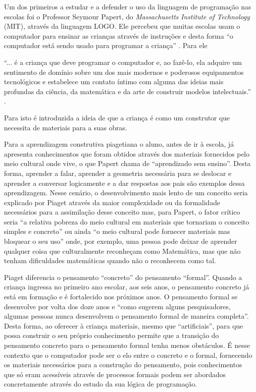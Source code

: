 \documentclass[12pt, openright, a4paper, brazil, english, french, spanish, bibjustif, openany, oneside]{abntex2}
\begin{document}
Um dos primeiros a estudar e a defender o uso da linguagem de programação nas escolas foi o Professor Seymour Papert, do \textit{Massachusetts Institute of Technology} (MIT), através da linguagem LOGO. Ele percebeu que muitas escolas usam o computador para ensinar as crianças através de instruções e desta forma ``o computador está sendo usado para programar a criança'' \cite{papert}. Para ele

\begin{citacao}

``... é a criança que deve programar o computador e, ao fazê-lo, ela adquire um sentimento de domínio sobre um dos mais modernos e poderosos equipamentos tecnológicos e estabelece um contato íntimo com alguma das ideias mais profundas da ciência, da matemática e da arte de construir modelos intelectuais.'' \cite{papert}.

\end{citacao}

Para isto é introduzida a ideia de que a criança é como um construtor que necessita de materiais para a suas obras. 

Para  a aprendizagem construtiva piagetiana o aluno, antes de ir à escola, já apresenta conhecimentos que foram obtidos através dos materiais fornecidos pelo meio cultural onde vive, o que Papert chama de ``aprendizado sem ensino''. Desta forma, aprender a falar, aprender a geometria necessária para se deslocar e aprender a conversar logicamente e a dar respostas aos pais são exemplos dessa aprendizagem. Nesse cenário, o desenvolvimento mais lento de um conceito seria explicado por Piaget através da maior complexidade ou da formalidade necessários para a assimilação desse conceito mas, para Papert, o fator crítico seria ``a relativa pobreza do meio cultural em materiais que tornariam o conceito simples e concreto'' ou ainda ``o meio cultural pode fornecer materiais mas bloquear o seu uso'' \cite{papert} onde, por exemplo, uma pessoa pode deixar de aprender qualquer coisa que culturalmente reconheçam como Matemática, mas que não tenham dificuldades matemáticas quando não o reconhecem como tal.

Piaget diferencia o pensamento ``concreto'' do pensamento ``formal''. Quando a criança ingressa no primeiro ano escolar, aos seis anos, o pensamento concreto já está em formação e é fortalecido nos próximos anos. O pensamento formal se desenvolve por volta dos doze anos e ``como sugerem alguns pesquisadores, algumas pessoas nunca desenvolvem o pensamento formal de maneira completa''\cite{papert}. Desta forma, ao oferecer à criança materiais, mesmo que ``artificiais'', para que possa construir o seu próprio conhecimento permite que a transição do pensamento concreto para o pensamento formal tenha menos obstáculos. É nesse contexto que o computador pode ser o elo entre o concreto e o formal, fornecendo os materiais necessários para a construção do pensamento, pois conhecimentos que só eram acessíveis através de processos formais podem ser abordados concretamente através do estudo da sua lógica de programação.
\end{document}
